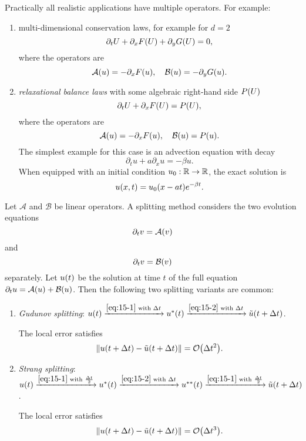 \begin{example}
	Practically all realistic applications have multiple operators.
	For example:
	\begin{enumerate}
		\item multi-dimensional conservation laws, for example for \(d = 2\)
		\[
			\partial_t U + \partial_x F\parentheses*{U} + \partial_y G\parentheses*{U} = 0,
		\]
		where the operators are
		\[
			\mathcal{A}\parentheses*{u} = -\partial_x F\parentheses*{u}, \quad \mathcal{B}\parentheses*{u} = -\partial_y G\parentheses*{u}.
		\]
		\item \emph{relaxational balance laws} with some algebraic right-hand side \(P\parentheses*{U}\)
		\[
			\partial_t U + \partial_x F\parentheses*{U} = P\parentheses*{U},
		\]
		where the operators are
		\[
			\mathcal{A}\parentheses*{u} = -\partial_x F\parentheses*{u}, \quad \mathcal{B}\parentheses*{u} = P\parentheses*{u}.
		\]
		The simplest example for this case is an advection equation with decay
		\[
			\partial_t u + a\partial_x u = -\beta u.
		\]
		When equipped with an initial condition \(u_0: \mathbb{R} \to \mathbb{R}\), the exact solution is
		\[
			u\parentheses*{x, t} = u_0\parentheses*{x - at}e^{-\beta t}.
		\]
	\end{enumerate}
\end{example}

\begin{theorem}
	Let \(\mathcal{A}\) and \(\mathcal{B}\) be linear operators.
	A splitting method considers the two evolution equations
	\begin{equation}\label{eq:15-1}
		\partial_t v = \mathcal{A}\parentheses*{v}
	\end{equation}
	and
	\begin{equation}\label{eq:15-2}
		\partial_t v = \mathcal{B}\parentheses*{v}
	\end{equation}
	separately.
	Let \(u\parentheses*{t}\) be the solution at time \(t\) of the full equation \(\partial_t u = \mathcal{A}\parentheses*{u} + \mathcal{B}\parentheses*{u}\).
	Then the following two splitting variants are common:
	\begin{enumerate}
		\item \emph{Gudunov splitting}: \(u\parentheses*{t} \xrightarrow{\eqref{eq:15-1}\text{ with }\Delta t}u^*\parentheses*{t} \xrightarrow{\eqref{eq:15-2}\text{ with }\Delta t} \tilde{u}\parentheses*{t + \Delta t}\).

		The local error satisfies
		\[
			\norm*{u\parentheses*{t + \Delta t} - \tilde{u}\parentheses*{t + \Delta t}} = \mathcal{O}\parentheses*{\Delta t^2}.
		\]
		\item \emph{Strang splitting}: \(u\parentheses*{t} \xrightarrow{\eqref{eq:15-1}\text{ with }\frac{\Delta t}{2}}u^*\parentheses*{t} \xrightarrow{\eqref{eq:15-2}\text{ with }\Delta t} u^{**}\parentheses*{t} \xrightarrow{\eqref{eq:15-1}\text{ with }\frac{\Delta t}{2}} \tilde{u}\parentheses*{t + \Delta t}\).

		The local error satisfies
		\[
			\norm*{u\parentheses*{t + \Delta t} - \tilde{u}\parentheses*{t + \Delta t}} = \mathcal{O}\parentheses*{\Delta t^3}.
		\]
	\end{enumerate}
\end{theorem}

